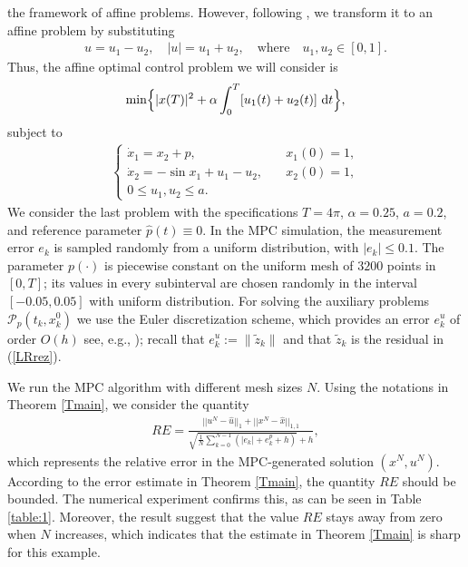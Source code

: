 \documentclass[11pt]{article}
\newcommand{\bd}{\begin{displaymath}}
\newcommand{\ed}{\end{displaymath}}
\newcommand{\bda}{\begin{eqnarray*}}
\newcommand{\eda}{\end{eqnarray*}}
\newcommand{\dd}{\mbox{\rm\,d}}
\newcommand{\p}{{\mathcal P}}
\begin{document}
the framework of affine problems. However, following \cite[Remark 3.3]{Sethi}, we transform 
it to an affine problem by substituting 
\begin{align*}
	u = u_1 - u_2, \quad  |u|=u_1+ u_2, \quad \text{where} \quad u_1, u_2 \in [0,1]. 
\end{align*} 
Thus, the affine optimal control problem we will consider is
\bd%
\begin{aligned}
       \text{min} \Big\{ |x(T)|^2 + \alpha \int_0^T [u_1(t)+u_2(t)]\, \dd t \Big\},
\end{aligned}
\ed %
subject to
\bda%
      \left\{ \begin{array}{llc}
        \dot{x}_1 = x_2 + p, \quad  &x_1(0) = 1,\\
        \dot{x}_2 = -\sin x_1 + u_1-u_2, \quad  &x_2(0) = 1,\\
              0 \leq u_1,u_2 \leq a.
\end{array}
\right.
\eda
We consider the last problem with the specifications $T=4\pi$, $\alpha = 0.25$, $a = 0.2$, 
and reference parameter $\hat{p}(t) \equiv 0$. In the MPC simulation,  
the measurement error $e_k$ is sampled randomly from a uniform distribution, with $|e_k|\le 0.1$.
The parameter $p(\cdot)$ is piecewise constant on the uniform mesh of $3200$ points in $[0,T]$; 
its values in every subinterval are chosen randomly in the interval $[-0.05, 0.05]$ with uniform distribution.  
For solving the auxiliary problems $\p_{p}(t_k, x_k^0)$ we use the Euler discretization scheme, 
which provides an error $e_k^{u}$ of order $O(h)$ see, e.g., \cite{WAlt+UF+MS-18, Os+Ve-20}); 
recall that $e_k^{u}:=\|\tilde z_k\|$ and that $\tilde z_k$ is the residual in (\ref{LRrez}).

We run the MPC algorithm with different mesh sizes $N$.
Using the notations in Theorem \ref{Tmain}, we consider the quantity
\begin{equation}
	\begin{aligned}
	RE = \frac{||u^N - \hat{u}||_1 + ||x^N - \hat{x}||_{1,1}}{\sqrt{\frac{1}{N}
             \sum_{k=0}^{N-1}(|e_k| + e_k^p + h)} + h},
	\end{aligned}
\end{equation}
which represents the relative error in the MPC-generated solution $(x^N, u^N)$. 
According to the error estimate in Theorem \ref{Tmain}, the quantity $RE$ should be bounded.	
The numerical experiment confirms this, as can be seen in Table \ref{table:1}.
Moreover, the result suggest that the value $RE$ stays away from zero when $N$ increases, 
which indicates that the estimate in Theorem \ref{Tmain} is sharp for this example.  
\end{document}
